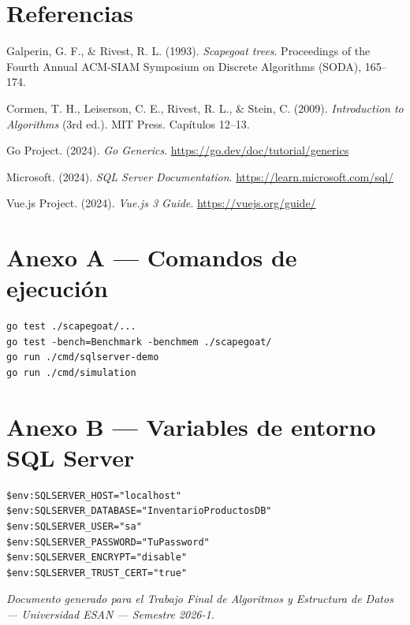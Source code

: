 \chapter*{Referencias}
{}

\begin{enumerate}[label={[\arabic*]}, leftmargin=2em, itemsep=0.4em]
  \item Galperin, G. F., \& Rivest, R. L. (1993). \textit{Scapegoat trees}. Proceedings of the Fourth Annual ACM-SIAM Symposium on Discrete Algorithms (SODA), 165--174.
  \item Cormen, T. H., Leiserson, C. E., Rivest, R. L., \& Stein, C. (2009). \textit{Introduction to Algorithms} (3rd ed.). MIT Press. Capítulos 12--13.
  \item Go Project. (2024). \textit{Go Generics}. \url{https://go.dev/doc/tutorial/generics}
  \item Microsoft. (2024). \textit{SQL Server Documentation}. \url{https://learn.microsoft.com/sql/}
  \item Vue.js Project. (2024). \textit{Vue.js 3 Guide}. \url{https://vuejs.org/guide/}
\end{enumerate}

\chapter*{Anexo A --- Comandos de ejecución}
{}

\begin{lstlisting}[style=gocode]
go test ./scapegoat/...
go test -bench=Benchmark -benchmem ./scapegoat/
go run ./cmd/sqlserver-demo
go run ./cmd/simulation
\end{lstlisting}

\chapter*{Anexo B --- Variables de entorno SQL Server}
{}

\begin{lstlisting}[style=pscode]
$env:SQLSERVER_HOST="localhost"
$env:SQLSERVER_DATABASE="InventarioProductosDB"
$env:SQLSERVER_USER="sa"
$env:SQLSERVER_PASSWORD="TuPassword"
$env:SQLSERVER_ENCRYPT="disable"
$env:SQLSERVER_TRUST_CERT="true"
\end{lstlisting}

\vfill
\begin{center}
  \small\textit{Documento generado para el Trabajo Final de Algoritmos y Estructura de Datos --- Universidad ESAN --- Semestre 2026-1.}
\end{center}
